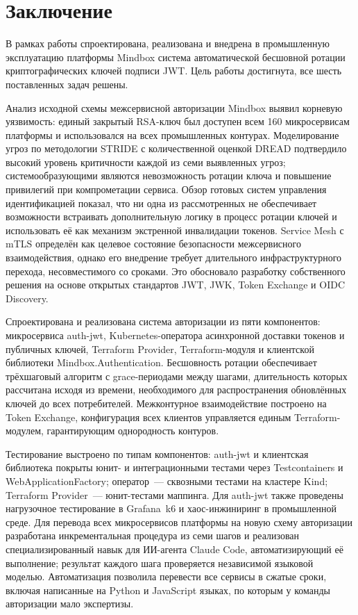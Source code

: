 \chapter*{Заключение} \label{ch-conclusion}

В рамках работы спроектирована, реализована и внедрена в промышленную
эксплуатацию платформы Mindbox система автоматической бесшовной ротации
криптографических ключей подписи JWT. Цель работы достигнута,
все шесть поставленных задач решены.

Анализ исходной схемы межсервисной авторизации Mindbox выявил
корневую уязвимость: единый закрытый RSA-ключ был доступен всем
160 микросервисам платформы и использовался на всех промышленных контурах.
Моделирование угроз по методологии STRIDE с количественной оценкой DREAD
подтвердило высокий уровень критичности каждой из семи выявленных угроз;
системообразующими являются невозможность ротации ключа и повышение привилегий
при компрометации сервиса.
Обзор готовых систем управления идентификацией показал, что ни одна
из рассмотренных не обеспечивает возможности встраивать дополнительную логику
в процесс ротации ключей и использовать её как механизм экстренной
инвалидации токенов. Service Mesh с mTLS определён как целевое состояние
безопасности межсервисного взаимодействия, однако его внедрение требует
длительного инфраструктурного перехода, несовместимого со сроками. Это
обосновало разработку собственного решения на основе открытых стандартов
JWT, JWK, Token Exchange и OIDC Discovery.

Спроектирована и реализована система авторизации из пяти компонентов:
микросервиса auth-jwt, Kubernetes-оператора асинхронной доставки токенов
и публичных ключей, Terraform Provider, Terraform-модуля и клиентской
библиотеки Mindbox.Authentication. Бесшовность ротации обеспечивает
трёхшаговый алгоритм с grace-периодами между шагами, длительность которых
рассчитана исходя из времени, необходимого для распространения обновлённых
ключей до всех потребителей. Межконтурное взаимодействие построено на Token Exchange,
конфигурация всех клиентов управляется единым Terraform-модулем,
гарантирующим однородность контуров.

Тестирование выстроено по типам компонентов: auth-jwt и клиентская
библиотека покрыты юнит- и интеграционными тестами через Testcontainers
и Web\-Application\-Factory; оператор~--- сквозными тестами на кластере
Kind; Terraform Provider~--- юнит-тестами маппинга. Для auth-jwt также
проведены нагрузочное тестирование в Grafana~k6 и хаос-инжиниринг
в промышленной среде. Для перевода всех микросервисов платформы на новую схему
авторизации разработана инкрементальная процедура из семи шагов
и реализован специализированный навык для ИИ-агента Claude Code,
автоматизирующий её выполнение; результат каждого шага проверяется
независимой языковой моделью. Автоматизация позволила
перевести все сервисы в сжатые сроки, включая написанные на Python
и JavaScript языках, по которым у команды авторизации мало экспертизы.

